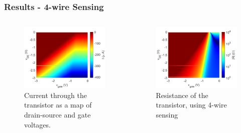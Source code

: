 \documentclass{beamer}
\begin{document}
\begin{frame}
    \frametitle{Results - 4-wire Sensing}

    \begin{columns}
        \begin{column}{0.5\textwidth}
            \begin{figure}
                \includegraphics[width = 1.1\textwidth]{210208resistance_005_2021.02.10.17.23.31_final_i.png}
                \caption{Current through the transistor as a map of drain-source and gate voltages.}
                \label{fig:4wirecurrent}
            \end{figure}
        \end{column}
        \begin{column}{0.5\textwidth}
            \begin{figure}
                \includegraphics[width = 1.1\textwidth]{210208resistance_005_2021.02.10.17.23.31_final_res.png}
                \caption{Resistance of the transistor, using 4-wire sensing}
                \label{fig:4wireresistance}
            \end{figure}
        \end{column}
    \end{columns}

\end{frame}
\end{document}
